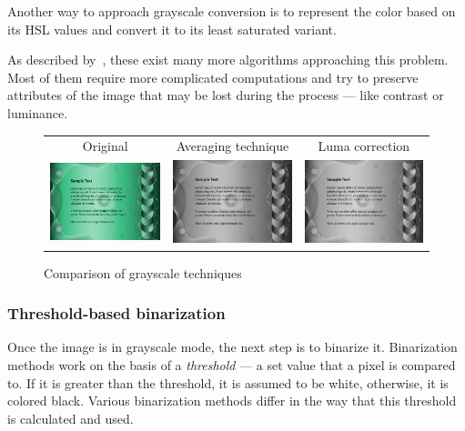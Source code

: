 Another way to approach grayscale conversion is to represent the color based on its HSL values and convert it to its least saturated variant.

As described by~\citet{grayscaleCadik}, these exist many more algorithms approaching this problem. Most of them require more complicated computations and try to preserve attributes of the image that may be lost during the process --- like contrast or luminance.

\begin{figure}[t]
\centering
{\sffamily
\begin{tabular}{ccc}
Original & Averaging technique & Luma correction \\
\includegraphics[width=.28\linewidth]{img/preprocessing/grayscale_orig.jpg}
&
\includegraphics[width=.28\linewidth]{img/preprocessing/grayscale_avg.png}
&
\includegraphics[width=.28\linewidth]{img/preprocessing/grayscale_luma.png}
\end{tabular}
}
\caption{Comparison of grayscale techniques}
\label{fig:preprocessGrayscale}
\end{figure}

\subsubsection{Threshold-based binarization}
Once the image is in grayscale mode, the next step is to binarize it. Binarization methods work on the basis of a \emph{threshold} --- a set value that a pixel is compared to. If it is greater than the threshold, it is assumed to be white, otherwise, it is colored black. Various binarization methods differ in the way that this threshold is calculated and used.

